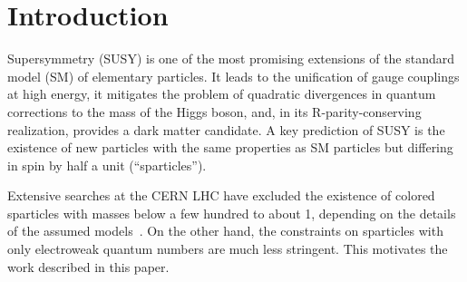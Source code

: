 \section{Introduction}
\label{sect:introduction}

Supersymmetry  (SUSY) \cite{Golfand:1971iw,Wess:1973kz,Wess:1974tw,Fayet1,Fayet2} is one of the most promising extensions of the 
standard model (SM) of elementary particles.  It leads to the unification of gauge couplings at
high energy, it mitigates the problem of quadratic divergences in quantum corrections to the
mass of the Higgs boson, and, in its R-parity-conserving realization, provides a dark matter candidate.
A key prediction of SUSY is the existence of new particles with the same properties as SM particles but
differing in spin by half a unit (``sparticles'').

Extensive searches at the CERN LHC have excluded the existence of colored sparticles with masses below a few hundred \GeV to about 1\TeV,
depending on the details of the assumed models~\cite{%
Chatrchyan:2013fea,Chatrchyan:2013mys,Chatrchyan:2014aea,Chatrchyan:2014lfa,%
Khachatryan:2015vra,Khachatryan:2015lwa,Aad:2015pfx,Aad:2015iea}. %
On the other hand, the constraints on sparticles with only electroweak quantum numbers are much less stringent.  This motivates the
work described in this paper.


